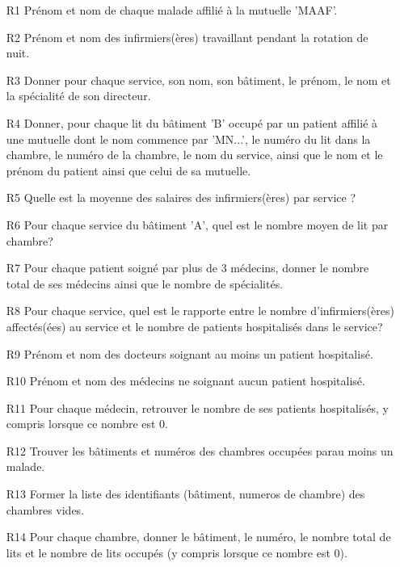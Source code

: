 \begin{enumerate}
  \item[R1] Prénom et nom de chaque malade affilié à la mutuelle 'MAAF'.
  \item[R2] Prénom et nom des infirmiers(ères) travaillant pendant la rotation de nuit.
  \item[R3] Donner pour chaque service, son nom, son bâtiment, le prénom, le nom et la spécialité de son directeur.
  
  \item[R4] Donner, pour chaque lit du bâtiment 'B' occupé par un patient affilié à une mutuelle dont le nom commence par 'MN...', le numéro du lit dans la chambre, le numéro de la chambre, le nom du service, ainsi que le nom et le prénom du patient ainsi que celui de sa mutuelle.
  
  \item[R5] Quelle est la moyenne des salaires des infirmiers(ères) par service ?
  
  \item[R6] Pour chaque service du bâtiment 'A', quel est le nombre moyen de lit par chambre?
  
  \item[R7] Pour chaque patient soigné par plus de 3 médecins, donner le nombre total de ses médecins ainsi que le nombre de spécialités.
  
  \item[R8] Pour chaque service, quel est le rapporte entre le nombre d'infirmiers(ères) affectés(ées) au service et le nombre de patients hospitalisés dans le service?
  
  \item[R9] Prénom et nom des docteurs soignant au moins un patient hospitalisé.
  
  \item[R10] Prénom et nom des médecins ne soignant aucun patient hospitalisé.
  
  \item[R11] Pour chaque médecin, retrouver le nombre de ses patients hospitalisés, y compris lorsque ce nombre est 0.
  
  \item[R12] Trouver les bâtiments et numéros des chambres occupées parau moins un malade.
  
  \item[R13] Former la liste des identifiants (bâtiment, numeros de chambre) des chambres vides.
  
  \item[R14] Pour chaque chambre, donner le bâtiment, le numéro, le nombre total de lits et le nombre de lits occupés (y compris lorsque ce nombre est 0).
  

\end{enumerate}
